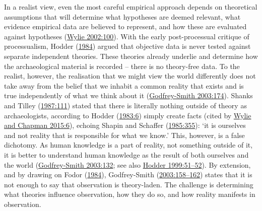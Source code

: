 \documentclass[
  12pt,
  a4paper,
  oneside]{book}
\begin{document}
In a realist view, even the most careful empirical approach depends on theoretical assumptions that will determine what hypotheses are deemed relevant, what evidence empirical data are believed to represent, and how these are evaluated against hypotheses (\protect\hyperlink{ref-wylie2002}{Wylie 2002:100}). With the early post-processual critique of processualism, Hodder (\protect\hyperlink{ref-hodder1984}{1984}) argued that objective data is never tested against separate independent theories. These theories already underlie and determine how the archaeological material is recorded -- there is no theory-free data. To the realist, however, the realisation that we might view the world differently does not take away from the belief that we inhabit a common reality that exists and is true independently of what we think about it (\protect\hyperlink{ref-godfrey-smith2003}{Godfrey-Smith 2003:174}). Shanks and Tilley (\protect\hyperlink{ref-shanks1987}{1987:111}) stated that \textquotesingle there is literally nothing outside of theory\textquotesingle{} as archaeologists, according to Hodder (\protect\hyperlink{ref-hodder1983}{1983:6}) simply \textquotesingle create facts\textquotesingle{} (cited by \protect\hyperlink{ref-wylie2015}{Wylie and Chapman 2015:6}), echoing Shapin and Schaffer (\protect\hyperlink{ref-shapin1985}{1985:355}): `it is ourselves and not reality that is responsible for what we know.' This, however, is a false dichotomy. As human knowledge is a part of reality, not something outside of it, it is better to understand human knowledge as the result of both ourselves and the world (\protect\hyperlink{ref-godfrey-smith2003}{Godfrey-Smith 2003:132}; see also \protect\hyperlink{ref-hodder1999}{Hodder 1999:51--52}). By extension, and by drawing on Fodor (\protect\hyperlink{ref-fodor1984}{1984}), Godfrey-Smith (\protect\hyperlink{ref-godfrey-smith2003}{2003:158--162}) states that it is not enough to say that observation is theory-laden. The challenge is determining what theories influence observation, how they do so, and how reality manifests in observation.
\end{document}
